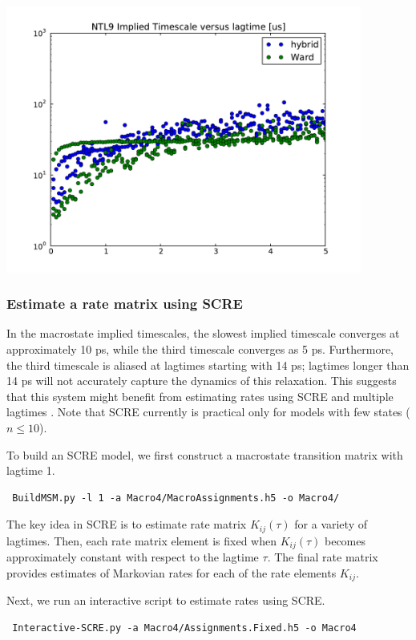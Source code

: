 \documentclass[12pt]{article}
\begin{document}
\includegraphics[width=11.7cm]{figures/NTL9-Timescales.pdf}


\subsubsection{Estimate a rate matrix using SCRE}

In the macrostate implied timescales, the slowest implied timescale converges at approximately 10 ps, while the third timescale converges as 5 ps.  Furthermore, the third timescale is aliased at lagtimes starting with 14 ps; lagtimes longer than 14 ps will not accurately capture the dynamics of this relaxation.  This suggests that this system might benefit from estimating rates using SCRE and multiple lagtimes \cite{beauchamp2012simple}.  Note that SCRE currently is practical only for models with few states ($n \le 10$).  

To build an SCRE model, we first construct a macrostate transition matrix with lagtime 1.  

\begin{verbatim}
 BuildMSM.py -l 1 -a Macro4/MacroAssignments.h5 -o Macro4/
\end{verbatim}

The key idea in SCRE is to estimate rate matrix $K_{ij}(\tau)$ for a variety of lagtimes.  Then, each rate matrix element is fixed when $K_{ij}(\tau)$ becomes approximately constant with respect to the lagtime $\tau$.  The final rate matrix provides estimates of Markovian rates for each of the rate elements $K_{ij}$.  

Next, we run an interactive script to estimate rates using SCRE.  

\begin{verbatim}
 Interactive-SCRE.py -a Macro4/Assignments.Fixed.h5 -o Macro4
\end{verbatim}
\end{document}
